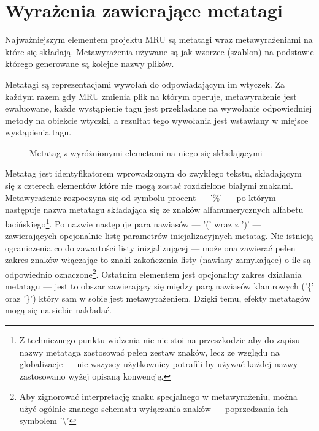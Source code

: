 \section{Wyrażenia zawierające metatagi}
Najważniejszym elementem projektu MRU są metatagi wraz metawyrażeniami na które się składają.
Metawyrażenia używane są jak wzorzec (szablon) na podstawie którego generowane są kolejne nazwy plików.

\par
Metatagi są reprezentacjami wywołań do odpowiadającym im wtyczek.
Za każdym razem gdy MRU zmienia plik na którym operuje, metawyrażenie jest ewaluowane, każde wystąpienie tagu jest przekładane na wywołanie odpowiedniej metody na obiekcie wtyczki, a rezultat tego wywołania jest wstawiany w miejsce wystąpienia tagu.

\begin{figure}
\begin{center}
\end{center}
\caption{Metatag z wyróżnionymi elemetami na niego się składającymi}
\end{figure}

\par
Metatag jest identyfikatorem wprowadzonym do zwykłego tekstu, składającym się z czterech elementów które nie mogą zostać rozdzielone białymi znakami. Metawyrażenie rozpoczyna się od symbolu procent --- '\%' --- po którym następuje nazwa metatagu składająca się ze znaków alfanumerycznych alfabetu łacińskiego\footnote{Z technicznego punktu widzenia nic nie stoi na przeszkodzie aby do zapisu nazwy metataga zastosować pełen zestaw znaków, lecz ze względu na globalizacje --- nie wszyscy użytkownicy potrafili by używać każdej nazwy --- zastosowano wyżej opisaną konwencję.}.
Po nazwie następuje para nawiasów --- '(' wraz z ')' --- zawierających opcjonalnie listę parametrów inicjalizacyjnych metatag. Nie istnieją ograniczenia co do zawartości listy inizjalizującej --- może ona zawierać pełen zakres znaków włączając to znaki zakończenia listy (nawiasy zamykające) o ile są odpowiednio oznaczone\footnote{Aby zignorować interpretację znaku specjalnego w metawyrażeniu, można użyć ogólnie znanego schematu wyłączania znaków --- poprzedzania ich symbolem '\textbackslash'}.
Ostatnim elementem jest opcjonalny zakres działania metatagu --- jest to obszar zawierający się między parą nawiasów klamrowych ('\{' oraz '\}') który sam w sobie jest metawyrażeniem. Dzięki temu, efekty metatagów mogą się na siebie nakładać.

